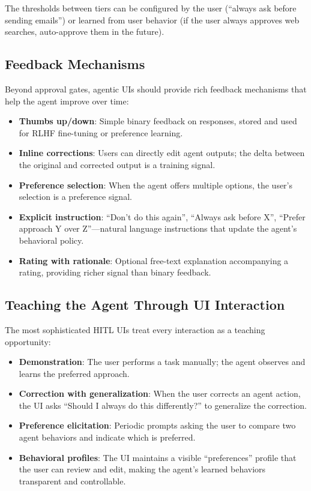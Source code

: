The thresholds between tiers can be configured by the user (``always ask before sending emails'') or learned from user behavior (if the user always approves web searches, auto-approve them in the future).

\subsection{Feedback Mechanisms}
\label{feedback-mechanisms}

Beyond approval gates, agentic UIs should provide rich feedback mechanisms that help the agent improve over time:

\begin{itemize}
  \item \textbf{Thumbs up/down}: Simple binary feedback on responses, stored and used for RLHF fine-tuning or preference learning.
  \item \textbf{Inline corrections}: Users can directly edit agent outputs; the delta between the original and corrected output is a training signal.
  \item \textbf{Preference selection}: When the agent offers multiple options, the user’s selection is a preference signal.
  \item \textbf{Explicit instruction}: ``Don’t do this again'', ``Always ask before X'', ``Prefer approach Y over Z''---natural language instructions that update the agent’s behavioral policy.
  \item \textbf{Rating with rationale}: Optional free-text explanation accompanying a rating, providing richer signal than binary feedback.
\end{itemize}

\subsection{Teaching the Agent Through UI Interaction}
\label{teaching-the-agent-through-ui-interaction}

The most sophisticated HITL UIs treat every interaction as a teaching opportunity:

\begin{itemize}
  \item \textbf{Demonstration}: The user performs a task manually; the agent observes and learns the preferred approach.
  \item \textbf{Correction with generalization}: When the user corrects an agent action, the UI asks ``Should I always do this differently?'' to generalize the correction.
  \item \textbf{Preference elicitation}: Periodic prompts asking the user to compare two agent behaviors and indicate which is preferred.
  \item \textbf{Behavioral profiles}: The UI maintains a visible ``preferences'' profile that the user can review and edit, making the agent’s learned behaviors transparent and controllable.
\end{itemize}


